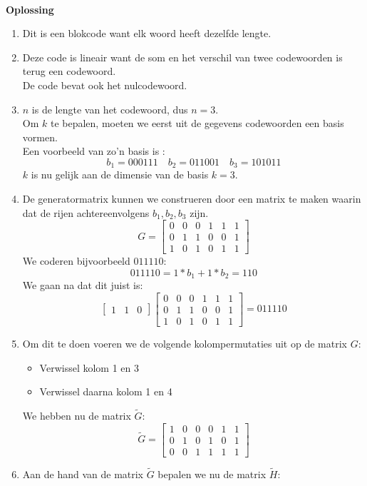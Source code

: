 \documentclass[11pt,a4paper,titlepage]{article}
\begin{document}
	\noindent \\ \textbf{Oplossing}
	\begin{enumerate}[label=(\alph*)]
	\item Dit is een blokcode want elk woord heeft dezelfde lengte.
	\item Deze code is lineair want de som en het verschil van twee codewoorden is terug een codewoord.\\ De code bevat ook het nulcodewoord.
	\item $n$ is de lengte van het codewoord, dus $n = 3$. \\
		Om $k$ te bepalen, moeten we eerst uit de gegevens codewoorden een basis vormen.\\
		Een voorbeeld van zo'n basis is :
			$$b_1 = 000111 \quad b_2 = 011001 \quad b_3 = 101011$$
		$k$ is nu gelijk aan de dimensie van de basis $k = 3$.
	\item De generatormatrix kunnen we construeren door een matrix te maken waarin dat de rijen achtereenvolgens $b_1, b_2, b_3$ zijn.
$$ G = 
 \begin{bmatrix}
0 & 0 & 0 & 1 & 1 & 1 \\
0 & 1 & 1 & 0 & 0 & 1 \\
1 & 0 & 1 & 0 & 1 & 1
 \end{bmatrix}$$
		We coderen bijvoorbeeld $011110$:
			$$011110 = 1* b_1 + 1* b_2 = 110$$
		We gaan na dat dit juist is:
		 $$  \begin{bmatrix}1&1&0\end{bmatrix}  \begin{bmatrix}
0 & 0 & 0 & 1 & 1 & 1 \\
0 & 1 & 1 & 0 & 0 & 1 \\
1 & 0 & 1 & 0 & 1 & 1
 \end{bmatrix} = 011110$$
	\item Om dit te doen voeren we de volgende kolompermutaties uit op de matrix $G$:
			\begin{itemize}	
				\item Verwissel kolom 1 en 3
				\item Verwissel daarna kolom 1 en 4
			\end{itemize}
		We hebben nu de matrix $\tilde{G}$:
			$$ \tilde{G} = 
 \begin{bmatrix}
1 & 0 & 0& 0  & 1 & 1 \\
0 & 1 & 0& 1 & 0 & 1 \\
0 & 0 & 1&1 & 1 & 1
 \end{bmatrix}$$
	\item Aan de hand van de matrix $\tilde{G}$ bepalen we nu de matrix $\tilde{H}$:

\end{enumerate}
\end{document}
